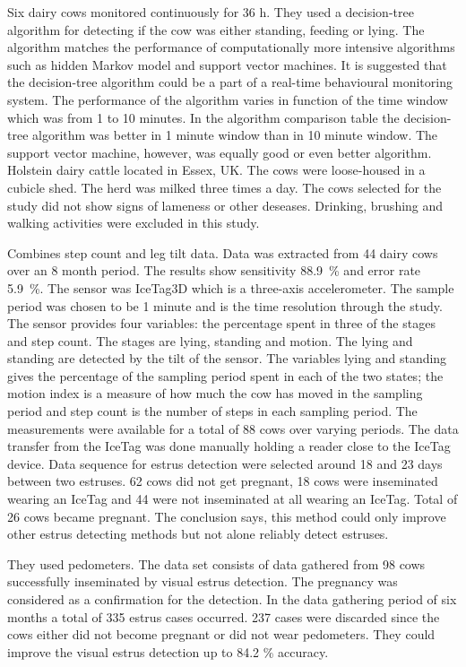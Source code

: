 \documentclass[english,12pt,a4paper,pdftex,elec,utf8]{aaltothesis}
\begin{document}
Six dairy cows monitored continuously for 36 h. They used a decision-tree algorithm for detecting if the cow was either standing, feeding or lying. The algorithm matches the performance of computationally more intensive algorithms such as hidden Markov model and support vector machines. It is suggested that the decision-tree algorithm could be a part of a real-time behavioural monitoring system. The performance of the algorithm varies in function of the time window which was from 1 to 10 minutes. In the algorithm comparison table the decision-tree algorithm was better in 1 minute window than in 10 minute window. The support vector machine, however, was equally good or even better algorithm. Holstein dairy cattle located in Essex, UK. The cows were loose-housed in a cubicle shed. The herd was milked three times a day. The cows selected for the study did not show signs of lameness or other deseases. Drinking, brushing and walking activities were excluded in this study. \cite{VazquezDiosdado2015}


Combines step count and leg tilt data. Data was extracted from 44 dairy cows over an 8 month period. The results show sensitivity \SI{88.9}{\percent} and error rate \SI{5.9}{\percent}. The sensor was IceTag3D \circledR which is a three-axis accelerometer. The sample period was chosen to be 1 minute and is the time resolution through the study. The sensor provides four variables: the percentage spent in three of the stages and step count. The stages are lying, standing and motion. The lying and standing are detected by the tilt of the sensor. The variables lying and standing gives the percentage of the sampling period spent in each of the two states; the motion index is a measure of how much the cow has moved in the sampling period and step count is the number of steps in each sampling period. The measurements were available for a total of 88 cows over varying periods. The data transfer from the IceTag was done manually holding a reader close to the IceTag device. Data sequence for estrus detection were selected around 18 and 23 days between two estruses. 62 cows did not get pregnant, 18 cows were inseminated wearing an IceTag and 44 were not inseminated at all wearing an IceTag. Total of 26 cows became pregnant. The conclusion says, this method could only improve other estrus detecting methods but not alone reliably detect estruses.
\cite{Jonsson20116}

They used pedometers. The data set consists of data gathered from 98 cows successfully inseminated by visual estrus detection. The pregnancy was considered as a confirmation for the detection. In the data gathering period of six months a total of 335 estrus cases occurred. 237 cases were discarded since the cows either did not become pregnant or did not wear pedometers. They could improve the visual estrus detection up to 84.2 \% accuracy. 
\cite{BRUNASSI2010}
\end{document}
